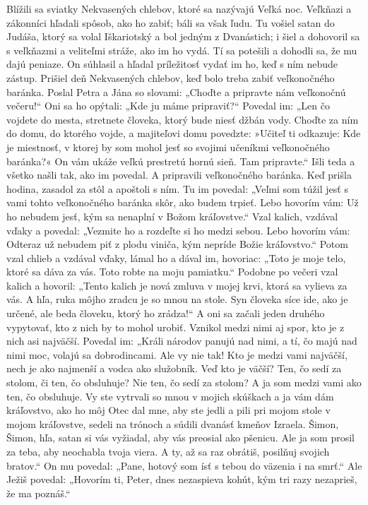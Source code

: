 Blížili sa sviatky Nekvasených chlebov, ktoré sa nazývajú Veľká noc. Veľkňazi a zákonníci hľadali spôsob, ako ho zabiť; báli sa však ľudu. Tu vošiel satan do Judáša, ktorý sa volal Iškariotský a bol jedným z Dvanástich; i šiel a dohovoril sa s veľkňazmi a veliteľmi stráže, ako im ho vydá. Tí sa potešili a dohodli sa, že mu dajú peniaze. On súhlasil a hľadal príležitosť vydať im ho, keď s ním nebude zástup.
\versseparator
Prišiel deň Nekvasených chlebov, keď bolo treba zabiť veľkonočného baránka. Poslal Petra a Jána so slovami: „Choďte a pripravte nám veľkonočnú večeru!“ Oni sa ho opýtali: „Kde ju máme pripraviť?“ Povedal im: „Len čo vojdete do mesta, stretnete človeka, ktorý bude niesť džbán vody. Choďte za ním do domu, do ktorého vojde, a majiteľovi domu povedzte: »Učiteľ ti odkazuje: Kde je miestnosť, v ktorej by som mohol jesť so svojimi učeníkmi veľkonočného baránka?« On vám ukáže veľkú prestretú hornú sieň. Tam pripravte.“ Išli teda a všetko našli tak, ako im povedal. A pripravili veľkonočného baránka.
\versseparator
Keď prišla hodina, zasadol za stôl a apoštoli s ním. Tu im povedal: „Veľmi som túžil jesť s vami tohto veľkonočného baránka skôr, ako budem trpieť. Lebo hovorím vám: Už ho nebudem jesť, kým sa nenaplní v Božom kráľovstve.“ Vzal kalich, vzdával vďaky a povedal: „Vezmite ho a rozdeľte si ho medzi sebou. Lebo hovorím vám: Odteraz už nebudem piť z plodu viniča, kým nepríde Božie kráľovstvo.“ 
Potom vzal chlieb a vzdával vďaky, lámal ho a dával im, hovoriac: „Toto je moje telo, ktoré sa dáva za vás. Toto robte na moju pamiatku.“ 
Podobne po večeri vzal kalich a hovoril: „Tento kalich je nová zmluva v mojej krvi, ktorá sa vylieva za vás.
\versseparator
A hľa, ruka môjho zradcu je so mnou na stole. Syn človeka síce ide, ako je určené, ale beda človeku, ktorý ho zrádza!“ A oni sa začali jeden druhého vypytovať, kto z nich by to mohol urobiť.
\versseparator
Vznikol medzi nimi aj spor, kto je z nich asi najväčší. 
Povedal im: „Králi národov panujú nad nimi, a tí, čo majú nad nimi moc, volajú sa dobrodincami. Ale vy nie tak! Kto je medzi vami najväčší, nech je ako najmenší a vodca ako služobník. Veď kto je väčší? Ten, čo sedí za stolom, či ten, čo obsluhuje? Nie ten, čo sedí za stolom? A ja som medzi vami ako ten, čo obsluhuje.
\versseparator
Vy ste vytrvali so mnou v mojich skúškach a ja vám dám kráľovstvo, ako ho môj Otec dal mne, aby ste jedli a pili pri mojom stole v mojom kráľovstve, sedeli na trónoch a súdili dvanásť kmeňov Izraela.
\versseparator
Šimon, Šimon, hľa, satan si vás vyžiadal, aby vás preosial ako pšenicu. Ale ja som prosil za teba, aby neochabla tvoja viera. A ty, až sa raz obrátiš, posilňuj svojich bratov.“ On mu povedal: „Pane, hotový som ísť s tebou do väzenia i na smrť.“ Ale Ježiš povedal: „Hovorím ti, Peter, dnes nezaspieva kohút, kým tri razy nezaprieš, že ma poznáš.“
